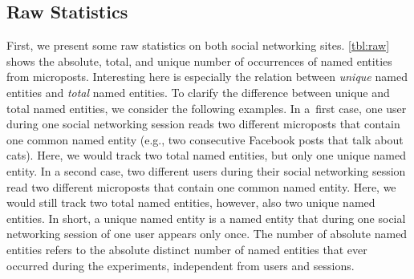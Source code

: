 \documentclass{iosart2c}
\begin{document}
\subsection{Raw Statistics} \label{sec:rawstatistics}
First, we present some raw statistics on both social networking sites.
\autoref{tbl:raw} shows the absolute, total, and unique number of occurrences of named entities from microposts.
Interesting here is especially the relation between \emph{unique} named entities and \emph{total} named entities.
To clarify the difference between unique and total named entities, we consider the following examples.
In a~first case, one user during one social networking session reads two different microposts that contain one common named entity (e.g., two consecutive Facebook posts that talk about cats).
Here, we would track two total named entities, but only one unique named entity.
In a second case, two different users during their social networking session read two different microposts that contain one common named entity. Here, we would still track two total named entities, however, also two unique named entities.
In short, a unique named entity is a named entity that during one social networking session of one user appears only once.
The number of absolute named entities refers to the absolute distinct number of named entities that ever occurred during the experiments, independent from users and sessions.
\end{document}
